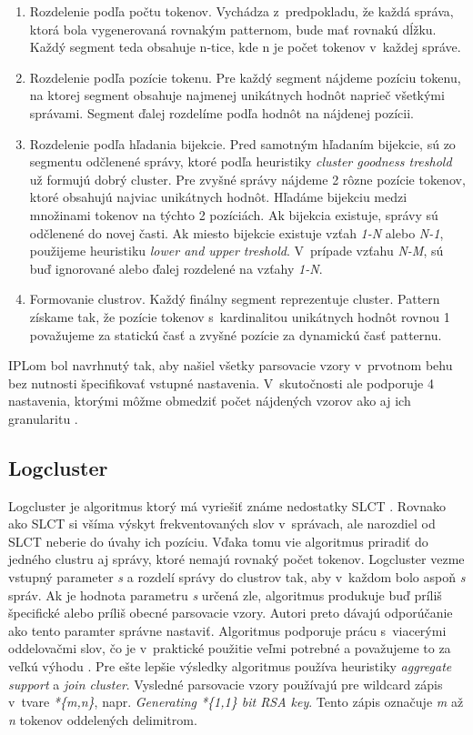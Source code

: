 \begin{enumerate}
  \item Rozdelenie podľa počtu tokenov. Vychádza z~predpokladu, že každá správa, ktorá bola vygenerovaná rovnakým patternom, bude mať rovnakú dĺžku. Každý segment teda obsahuje n-tice, kde n je počet tokenov v~každej správe.
  \item Rozdelenie podľa pozície tokenu. Pre každý segment nájdeme pozíciu tokenu, na ktorej segment obsahuje najmenej unikátnych hodnôt naprieč všetkými správami. Segment ďalej rozdelíme podľa hodnôt na nájdenej pozícii.
  \item Rozdelenie podľa hľadania bijekcie. Pred samotným hľadaním bijekcie, sú zo segmentu odčlenené správy, ktoré podľa heuristiky \emph{cluster goodness treshold} už formujú dobrý cluster. Pre zvyšné správy nájdeme 2 rôzne pozície tokenov, ktoré obsahujú najviac unikátnych hodnôt. Hľadáme bijekciu medzi množinami tokenov na týchto 2 pozíciách. Ak bijekcia existuje, správy sú odčlenené do novej časti. Ak miesto bijekcie existuje vzťah \emph{1-N} alebo \emph{N-1}, použijeme heuristiku \emph{lower and upper treshold}. V~prípade vzťahu \emph{N-M}, sú buď ignorované alebo ďalej rozdelené na vzťahy \emph{1-N}.
  \item Formovanie clustrov. Každý finálny segment reprezentuje cluster. Pattern získame tak, že pozície tokenov s~kardinalitou unikátnych hodnôt rovnou 1 považujeme za statickú časť a zvyšné pozície za dynamickú časť patternu.
\end{enumerate}

IPLom bol navrhnutý tak, aby našiel všetky parsovacie vzory v~prvotnom behu bez nutnosti špecifikovať vstupné nastavenia. V~skutočnosti ale podporuje 4 nastavenia, ktorými môžme obmedziť počet nájdených vzorov ako aj ich granularitu \parencite{nagappanvouk}.

\subsection{Logcluster}

Logcluster je algoritmus ktorý má vyriešiť známe nedostatky SLCT \parencite{logcluster}. Rovnako ako SLCT si všíma výskyt frekventovaných slov v~správach, ale narozdiel od SLCT neberie do úvahy ich pozíciu. Vďaka tomu vie algoritmus priradiť do jedného clustru aj správy, ktoré nemajú rovnaký počet tokenov. Logcluster vezme vstupný parameter \emph{s}  a rozdelí správy do clustrov tak, aby v~každom bolo aspoň \emph{s} správ. Ak je hodnota parametru \emph{s} určená zle, algoritmus produkuje buď príliš špecifické alebo príliš obecné parsovacie vzory. Autori preto dávajú odporúčanie ako tento paramter správne nastaviť. Algoritmus podporuje prácu s~viacerými oddelovačmi slov, čo je v~praktické použitie veľmi potrebné a považujeme to za veľkú výhodu \parencite{logclustertool}. Pre ešte lepšie výsledky algoritmus používa heuristiky \emph{aggregate \, support} a \emph{join cluster}. Vysledné parsovacie vzory používajú pre wildcard zápis v~tvare \emph{*\{m,n\}}, napr. \emph{Generating *\{1,1\} bit RSA key}. Tento zápis označuje \emph{m} až \emph{n} tokenov oddelených delimitrom.


